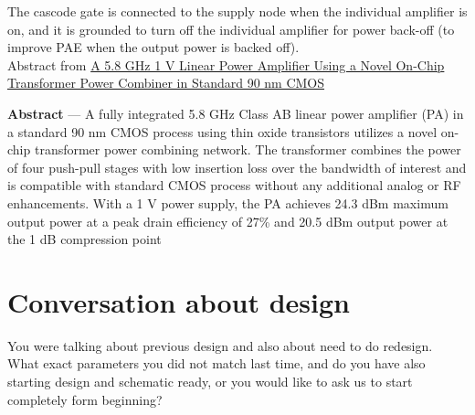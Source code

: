 \documentclass{article}
\begin{document}


The cascode gate is connected to the supply node when the individual amplifier is on, and it is grounded to turn off the individual amplifier for power back-off (to improve PAE when the output power is backed off).\\


Abstract from \href{https://ieeexplore.ieee.org/document/4494655}{A 5.8 GHz 1 V Linear Power Amplifier Using a Novel On-Chip Transformer Power Combiner in Standard 90 nm CMOS}

\begin{info}
	\textbf{Abstract} — A fully integrated 5.8 GHz Class AB linear power amplifier (PA) in a standard 90 nm CMOS process using thin oxide transistors utilizes a novel on-chip transformer power combining network. The transformer combines the power of four push-pull stages with low insertion loss over the bandwidth of interest and is compatible with standard CMOS process without any additional analog or RF enhancements. With a 1 V power supply, the PA achieves 24.3 dBm maximum output power at a peak drain efficiency of 27\% and 20.5 dBm output power at the 1 dB compression point
\end{info}





\section{Conversation about design}

You were talking about previous design and also about need to do redesign. What exact parameters you did not match last time, and do you have also starting design and schematic ready, or you would like to ask us to start completely form beginning?
\end{document}
